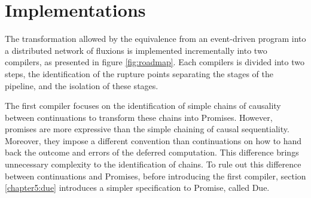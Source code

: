 \chapter{Implementations} \label{chapter5}
\minitoc
\eject
The transformation allowed by the equivalence from an event-driven program into a distributed network of fluxions is implemented incrementally into two compilers, as presented in figure \ref{fig:roadmap}.
Each compilers is divided into two steps, the identification of the rupture points separating the stages of the pipeline, and the isolation of these stages.

\begin{figure}[h!]%
\end{figure}

The first compiler focuses on the identification of simple chains of causality between continuations to transform these chains into Promises.
However, promises are more expressive than the simple chaining of causal sequentiality.
Moreover, they impose a different convention than continuations on how to hand back the outcome and errors of the deferred computation.
This difference brings unnecessary complexity to the identification of chains.
To rule out this difference between continuations and Promises, before introducing the first compiler, section \ref{chapter5:due} introduces a simpler specification to Promise, called Due.

